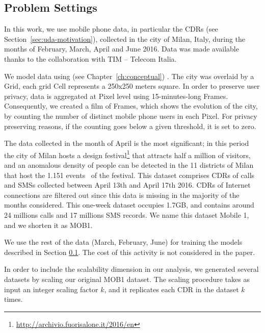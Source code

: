 {\subsection{Problem Settings}\label{sec:comp-mod-eval-cost-prob} \label{sec:desc}

In this work, we use mobile phone data, in particular the CDRs (see Section~\ref{sec:uda-motivation}), collected in the city of Milan, Italy, during the months of February, March, April and June 2016. Data was made available thanks to the collaboration with TIM -- Telecom Italia.

We model data using \frappe{} (see Chapter~\ref{ch:conceptual}) .
The city was overlaid by a \textsf{Grid}, each grid \textsf{Cell} represents a 250x250 meters square. 
In order to preserve user privacy, data is aggregated at \textsf{Pixel} level using 15-minutes-long \textsf{Frame}s.
Consequently, we created a film of \textsf{Frame}s, which shows the evolution of the city, by counting the number of distinct mobile phone users in each \textsf{Pixel}. For privacy preserving reasons, if the counting goes below a given threshold, it is set to zero.

The data collected in the month of April is the most significant; in this period the city of Milan hosts a design festival\footnote{\url{http://archivio.fuorisalone.it/2016/en}} that attracts half a million of visitors, and an anomalous density of people can be detected in the 11 districts of Milan that host the 1.151 events~\cite{DBLP:journals/ieeemm/BalduiniVALAC15} of the festival. This dataset comprises CDRs of calls and SMSs collected between April 13th and April 17th 2016. CDRs of Internet connections are filtered out since this data is missing in the majority of the months considered. This one-week dataset occupies 1.7GB, and contains around 24 millions calls and 17 millions SMS records. We name this dataset Mobile 1, and we shorten it as MOB1. 

We use the rest of the data (March, February, June) for training the models described in Section \ref{sec:comp-mod-eval-cost-prob}. The cost of this activity is not considered in the paper.

In order to include the scalability dimension in our analysis, we generated several datasets by scaling our original MOB1 dataset. The scaling procedure takes as input an integer scaling factor $k$, and it replicates each CDR in the dataset $k$ times.

}

